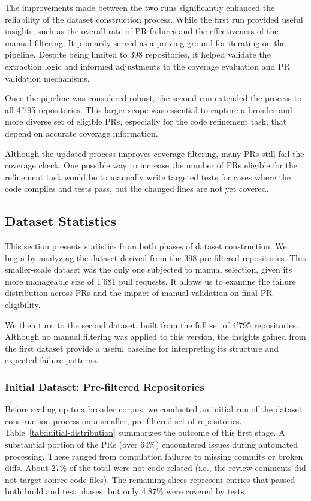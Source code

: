 The improvements made between the two runs significantly enhanced the reliability of the dataset
construction process. While the first run provided useful insights, such as the overall rate of PR
failures and the effectiveness of the manual filtering. It primarily served as a proving ground for
iterating on the pipeline. Despite being limited to 398 repositories, it helped validate the
extraction logic and informed adjustments to the coverage evaluation and PR validation mechanisms.

Once the pipeline was considered robust, the second run extended the process to all 4'795
repositories. This larger scope was essential to capture a broader and more diverse set of eligible
PRs, especially for the code refinement task, that depend on accurate coverage information.

Although the updated process improves coverage filtering, many PRs still fail the coverage check.
One possible way to increase the number of PRs eligible for the refinement task would be to manually
write targeted tests for cases where the code compiles and tests pass, but the changed lines are not
yet covered.

\subsection{Dataset Statistics}

This section presents statistics from both phases of dataset construction. We begin by analyzing the
dataset derived from the 398 pre-filtered repositories. This smaller-scale dataset was the only one
subjected to manual selection, given its more manageable size of 1'681 pull requests. It allows us
to examine the failure distribution across PRs and the impact of manual validation on final PR
eligibility.

We then turn to the second dataset, built from the full set of 4'795 repositories. Although no
manual filtering was applied to this version, the insights gained from the first dataset provide a
useful baseline for interpreting its structure and expected failure patterns.

\subsubsection{Initial Dataset: Pre-filtered Repositories}
\label{sec:stat-small}

Before scaling up to a broader corpus, we conducted an initial run of the dataset construction
process on a smaller, pre-filtered set of repositories. Table~\ref{tab:initial-distribution}
summarizes the outcome of this first stage. A substantial portion of the PRs (over 64\%) encountered
issues during automated processing. These ranged from compilation failures to missing commits or
broken diffs. About 27\% of the total were not code-related (i.e., the review comments did not
target source code files). The remaining slices represent entries that passed both build and test
phases, but only 4.87\% were covered by tests.


